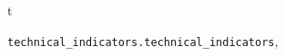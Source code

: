 \documentclass[letterpaper,10pt,english]{sphinxmanual}
\begin{document}
\renewcommand{\indexname}{Python Module Index}
\begin{theindex}
\def\bigletter#1{{\Large\sffamily#1}\nopagebreak\vspace{1mm}}
\bigletter{t}
\item {\texttt{technical\_indicators.technical\_indicators}}, \pageref{reference:module-technical_indicators.technical_indicators}
\end{theindex}

\renewcommand{\indexname}{Index}
\printindex
\end{document}

